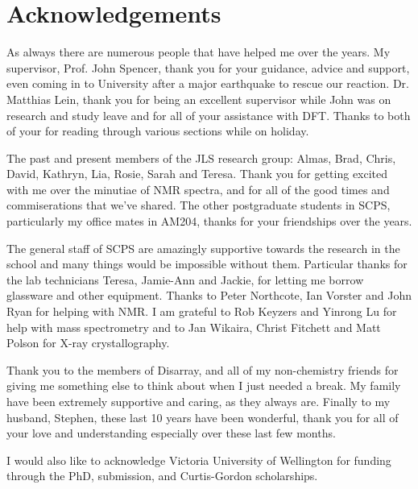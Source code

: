 
\chapter*{Acknowledgements}
\label{ch:acknowledgements}

As always there are numerous people that have helped me over the years.  My supervisor, Prof. John Spencer, thank you for your guidance, advice and support, even coming in to University after a major earthquake to rescue our reaction. Dr. Matthias Lein, thank you for being an excellent supervisor while John was on research and study leave and for all of your assistance with DFT.  Thanks to both of your for reading through various sections while on holiday.

The past and present members of the JLS research group: Almas, Brad, Chris, David, Kathryn, Lia, Rosie, Sarah and Teresa.  Thank you for getting excited with me over the minutiae of NMR spectra, and for all of the good times and commiserations that we've shared.  The other postgraduate students in SCPS, particularly my office mates in AM204, thanks for your friendships over the years.

The general staff of SCPS are amazingly supportive towards the research in the school and many things would be impossible without them.  Particular thanks for the lab technicians Teresa, Jamie-Ann and Jackie, for letting me borrow glassware and other equipment.  Thanks to Peter Northcote, Ian Vorster and John Ryan for helping with NMR.  I am grateful to Rob Keyzers and Yinrong Lu for help with mass spectrometry and to Jan Wikaira, Christ Fitchett and Matt Polson for X-ray crystallography.  

Thank you to the members of Disarray, and all of my non-chemistry friends for giving me something else to think about when I just needed a break.  My family have been extremely supportive and caring, as they always are.  Finally to my husband, Stephen, these last 10 years have been wonderful, thank you for all of your love and understanding especially over these last few months.

I would also like to acknowledge Victoria University of Wellington for funding through the PhD, submission, and Curtis-Gordon scholarships.  
%
